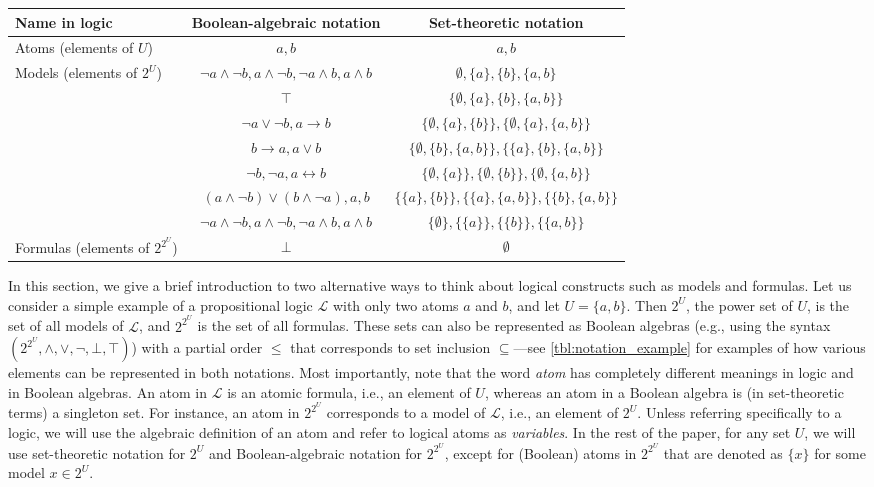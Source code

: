 \documentclass{article}
\begin{document}
\begin{table*}
  \centering
  \begin{tabular}{lcc}
    \toprule
    Name in logic & Boolean-algebraic notation & Set-theoretic notation \\
    \midrule
    Atoms (elements of $U$) & $a, b$ & $a, b$ \\
    \rowcolor{gray!10} Models (elements of $2^U$) & $\neg a \land \neg b, a \land \neg b, \neg a \land b, a \land b$ & $\emptyset, \{a\}, \{b\}, \{a, b\}$ \\
    & $\top$ & $\{ \emptyset, \{a\}, \{b\}, \{a, b\} \}$ \\
    & $\neg a \lor \neg b, a \to b$ & $\{ \emptyset, \{a\}, \{b\} \}, \{ \emptyset, \{a\}, \{a, b\} \}$ \\
    & $b \to a, a \lor b$ & $\{ \emptyset, \{b\}, \{a, b\} \}, \{ \{a\}, \{b\}, \{a, b\} \}$ \\
    & $\neg b, \neg a, a \leftrightarrow b$ & $\{\emptyset, \{a\}\}, \{\emptyset, \{b\}\}, \{\emptyset, \{a, b\}\}$ \\
    & $(a \land \neg b) \lor (b \land \neg a), a, b$ & $\{\{a\}, \{b\}\}, \{\{a\}, \{a, b\}\}, \{\{b\}, \{a, b\}\}$ \\
    & $\neg a \land \neg b, a \land \neg b, \neg a \land b, a \land b$ & $\{\emptyset\}, \{\{a\}\}, \{\{b\}\}, \{\{a, b\}\}$ \\
    \multirow{-7}{*}{Formulas (elements of $2^{2^U}$)} & $\bot$ & $\emptyset$ \\
    \bottomrule
  \end{tabular}
  \caption{Notation for a logic with two atoms. The elements in both columns are
    listed in the same order.}
  \label{tbl:notation_example}
\end{table*}

In this section, we give a brief introduction to two alternative ways to think
about logical constructs such as models and formulas. Let us consider a simple
example of a propositional logic $\mathcal{L}$ with only two atoms $a$ and $b$,
and let $U = \{ a, b \}$. Then $2^U$, the power set of $U$, is the set of all
models of $\mathcal{L}$, and $2^{2^U}$ is the set of all formulas. These sets
can also be represented as Boolean algebras (e.g., using the syntax $(2^{2^U},
\land, \lor, \neg, \bot, \top)$) with a partial order $\le$ that corresponds to
set inclusion $\subseteq$---see \cref{tbl:notation_example} for examples of how
various elements can be represented in both notations. Most importantly, note
that the word \emph{atom} has completely different meanings in logic and in
Boolean algebras. An atom in $\mathcal{L}$ is an atomic formula, i.e., an
element of $U$, whereas an atom in a Boolean algebra is (in set-theoretic terms)
a singleton set. For instance, an atom in $2^{2^U}$ corresponds to a model of
$\mathcal{L}$, i.e., an element of $2^U$. Unless referring specifically to a
logic, we will use the algebraic definition of an atom and refer to logical
atoms as \emph{variables}. In the rest of the paper, for any set $U$, we will
use set-theoretic notation for $2^U$ and Boolean-algebraic notation for
$2^{2^U}$, except for (Boolean) atoms in $2^{2^U}$ that are denoted as $\{x\}$
for some model $x \in 2^U$.
\end{document}
